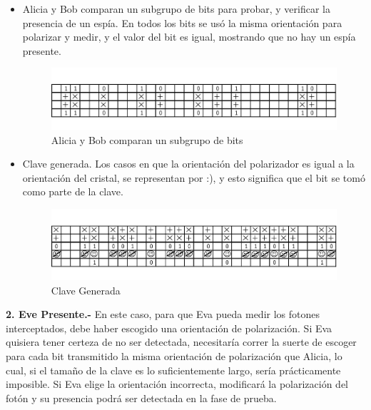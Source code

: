 \documentclass[11pt, conference]{IEEEtran}
\begin{document}
\begin{itemize}
	Alicia le dice a Bob (canal clasico) el valor de los bits que debió haber medido, y la verificación debe asegurar que los bits de Bob concuerdan al 100\% con los de Alicia.
	
	La probabilidad de detectar un espía que esté presente es $1-\left(\frac{3}{4}\right)^{N}$.
	
	\item Alicia y Bob comparan un subgrupo de bits para probar, y verificar la presencia de un espía. En todos los bits se usó la misma orientación para polarizar y medir, y el valor del bit es igual, mostrando que no hay un espía presente.
	
	\begin{figure}[hbtp]
		\centering
		\includegraphics[scale=0.22]{5.png} 
		\caption{Alicia y Bob comparan un subgrupo de bits}
	\end{figure}
	
	\item Clave generada. Los casos en que la orientación del polarizador es igual a la orientación del cristal, se representan por :), y esto significa que el bit se tomó como parte de la clave.
	
	\begin{figure}[hbtp]
		\centering
		\includegraphics[scale=0.22]{6.png} 
		\caption{Clave Generada}
	\end{figure}
	
\end{itemize}

{\bf 2. Eve Presente.- } En este caso, para que Eva pueda medir los fotones interceptados, debe haber escogido una orientación de polarización. Si Eva quisiera tener certeza de no ser detectada, necesitaría correr la suerte de escoger para cada bit transmitido la misma orientación de polarización que Alicia, lo cual, si el tamaño de la clave es lo suficientemente largo, sería prácticamente imposible. Si Eva elige la orientación incorrecta, modificará la polarización del fotón y su presencia podrá ser detectada en la fase de prueba.\cite{Papa04}
\end{document}
